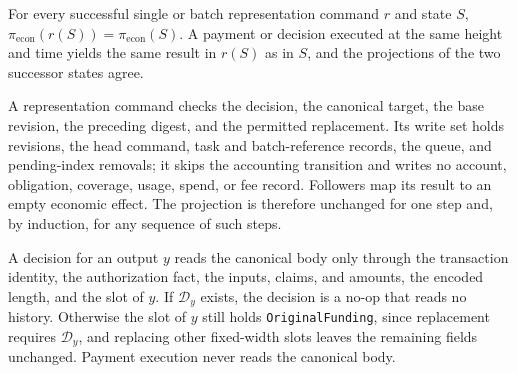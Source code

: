 \begin{lemma}
\label{lem:security-representation}
For every successful single or batch representation command $r$ and
state $S$, $\pi_{\mathrm{econ}}(r(S))=\pi_{\mathrm{econ}}(S)$. A payment
or decision executed at the same height and time yields the same
result in $r(S)$ as in $S$, and the projections of the two successor states
agree.
\end{lemma}
\begin{IEEEproof}
A representation command checks the decision, the canonical target, the base revision, the preceding digest, and the permitted replacement. Its write set holds revisions, the head command, task and batch-reference records, the queue, and pending-index removals; it skips the accounting transition and writes no account, obligation, coverage, usage, spend, or fee record. Followers map its result to an empty economic effect. The projection is therefore unchanged for one step and, by induction, for any sequence of such steps.

A decision for an output $y$ reads the canonical body only through the transaction identity, the authorization fact, the inputs, claims, and amounts, the encoded length, and the slot of $y$. If $\mathcal D_y$ exists, the decision is a no-op that reads no history. Otherwise the slot of $y$ still holds \texttt{OriginalFunding}, since replacement requires $\mathcal D_y$, and replacing other fixed-width slots leaves the remaining fields unchanged. Payment execution never reads the canonical body.
\end{IEEEproof}

